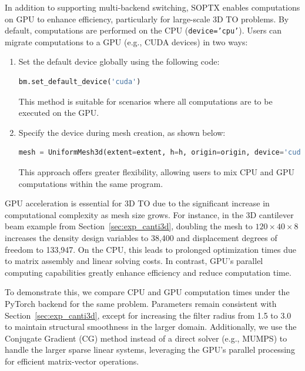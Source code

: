 \documentclass[mathpazo]{cicp}
\begin{document}
In addition to supporting multi-backend switching, SOPTX enables computations on GPU to enhance efficiency, particularly for large-scale 3D TO problems. By default, computations are performed on the CPU (\texttt{device='cpu'}). Users can migrate computations to a GPU (e.g., CUDA devices) in two ways:
\vspace{-0.5ex} %
\begin{enumerate}
	\item Set the default device globally using the following code:
\begin{lstlisting}[language=python]
bm.set_default_device('cuda')
\end{lstlisting}
	This method is suitable for scenarios where all computations are to be executed on the GPU.
	\item Specify the device during mesh creation, as shown below:
\begin{lstlisting}[language=python]
mesh = UniformMesh3d(extent=extent, h=h, origin=origin, device='cuda')
\end{lstlisting}
	This approach offers greater flexibility, allowing users to mix CPU and GPU computations within the same program.	
\end{enumerate}
\vspace{-0.5ex} %

GPU acceleration is essential for 3D TO due to the significant increase in computational complexity as mesh size grows. For instance, in the 3D cantilever beam example from Section~\ref{sec:exp_canti3d}, doubling the mesh to $120\times40\times8$ increases the density design variables to 38,400 and displacement degrees of freedom to 133,947. On the CPU, this leads to prolonged optimization times due to matrix assembly and linear solving costs. In contrast, GPU's parallel computing capabilities greatly enhance efficiency and reduce computation time.

To demonstrate this, we compare CPU and GPU computation times under the PyTorch backend for the same problem. Parameters remain consistent with Section~\ref{sec:exp_canti3d}, except for increasing the filter radius from 1.5 to 3.0 to maintain structural smoothness in the larger domain. Additionally, we use the Conjugate Gradient (CG) method instead of a direct solver (e.g., MUMPS) to handle the larger sparse linear systems, leveraging the GPU's parallel processing for efficient matrix-vector operations.
\end{document}
